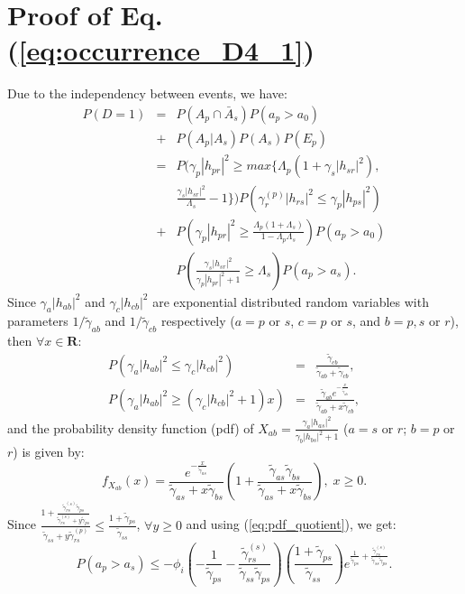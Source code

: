 \documentclass[conference,twocolumn]{IEEEtran}
\begin{document}
\section{Proof of Eq.(\ref{eq:occurrence_D4_1})}
Due to the independency between events, we have:
\begin{eqnarray}
\label{eq:d_4_1_demo}
\nonumber P(D=1)&=&P\left( A_p \cap \bar{A}_s \right) P\left(a_p > a_0 \right)\\
\nonumber &+& P(A_p|A_s)P(A_s)P(E_p)\\
\nonumber &=&P(\gamma_p |h_{pr}|^2 \geq max\{ \Lambda_p (1+\gamma_s |h_{sr}|^2) ,\\
\nonumber &{}& \frac{\gamma_s |h_{sr}|^2}{\Lambda_s}-1\})P(\gamma_r^{(p)} |h_{rs}|^2 \leq \gamma_p |h_{ps}|^2)\\
\nonumber &+& P(\gamma_p |h_{pr}|^2\geq \frac{\Lambda_p (1+ \Lambda_s)}{1-\Lambda_p \Lambda_s})P(a_p>a_0)\\
&{}& P(\frac{\gamma_s |h_{sr}|^2}{\gamma_p |h_{pr}|^2+1}\geq \Lambda_s)P(a_p>a_s).
\label{eq:d_4_1_demo2}
\end{eqnarray}
Since $\gamma_a |h_{ab}|^2$ and $\gamma_c |h_{cb}|^2$ are exponential distributed random variables with parameters $1/\tilde{\gamma}_{ab}$ and $1/\tilde{\gamma}_{cb}$ respectively ($a=p$ or $s$, $c=p$ or $s$, and $b=p,s$ or $r$), then $\forall x \in \mathbf{R}$:
\begin{eqnarray}
\label{eq:liste1}
P(\gamma_a |h_{ab}|^2 \leq \gamma_c |h_{cb}|^2)&=&\frac{\tilde{\gamma}_{cb}}{\tilde{\gamma}_{ab}+\tilde{\gamma}_{cb}} ,\\
\label{eq:liste3}
P(\gamma_a |h_{ab}|^2 \geq (\gamma_c |h_{cb}|^2+1) x)&=&\frac{{\tilde{\gamma}_{ab}}e^{-\frac{x}{\tilde{\gamma}_{ab}}}}{{\tilde{\gamma}_{ab}}+x {\tilde{\gamma}_{cb}}},
\end{eqnarray}
and the probability density function (pdf) of $X_{ab}=\frac{\gamma_a |h_{as}|^2}{\gamma_b |h_{bs}|^2+1}$ ($a=s$ or $r$; $b=p$ or $r$) is given by:
\begin{equation}
\label{eq:pdf_quotient}
f_{X_{ab}}(x)=\frac{e^{-\frac{x}{\tilde{\gamma}_{as}}}}{\tilde{\gamma}_{as}+x \tilde{\gamma}_{bs}}\left( 1+ \frac{\tilde{\gamma}_{as}\tilde{\gamma}_{bs}}{\tilde{\gamma}_{as}+x \tilde{\gamma}_{bs}} \right),\; x \geq 0.
\end{equation}
Since $\frac{1+\frac{\tilde{\gamma}_{rs}^{(s)}\tilde{\gamma}_{ps}}{\tilde{\gamma}_{rs}^{(s)}+y \tilde{\gamma}_{ps}}}{\tilde{\gamma}_{ss}+y \tilde{\gamma}_{rs}^{(p)}} \leq \frac{1+\tilde{\gamma}_{ps}}{\tilde{\gamma}_{ss}}$, $\forall y\geq 0$ and using (\ref{eq:pdf_quotient}), we get:
\begin{equation}
\label{eq:upPEp}
P(a_p>a_s)\leq -\phi_i\left( -\frac{1}{\tilde{\gamma}_{ps}}- \frac{\tilde{\gamma}_{rs}^{(s)}}{\tilde{\gamma}_{ss}\tilde{\gamma}_{ps}} \right)\left( \frac{1+\tilde{\gamma}_{ps}}{\tilde{\gamma}_{ss}} \right)e^{ \frac{1}{\tilde{\gamma}_{ps}} + \frac{\tilde{\gamma}_{rs}^{(s)}}{\tilde{\gamma}_{ss}\tilde{\gamma}_{ps}} }.
\end{equation}
\end{document}
